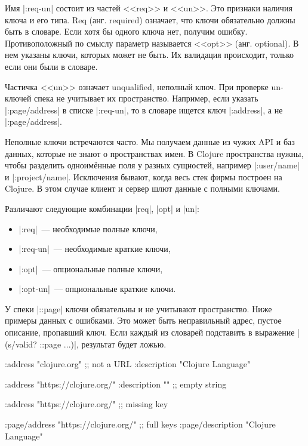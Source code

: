 Имя \spverb|:req-un| состоит из частей <<req>> и <<un>>. Это признаки наличия
ключа и его типа. Req (анг. required) означает, что ключи обязательно должны
быть в словаре. Если хотя бы одного ключа нет, получим ошибку. Противоположный
по смыслу параметр называется <<opt>> (анг. optional). В нем указаны ключи,
которых может не быть. Их валидация происходит, только если они были в словаре.


Частичка <<un>> означает unqualified, неполный ключ. При проверке un-ключей
спека не учитывает их пространство. Например, если указать
\spverb|:page/address| в списке \spverb|:req-un|, то в словаре ищется ключ
\spverb|:address|, а не \spverb|:page/address|.

Неполные ключи встречаются часто. Мы получаем данные из чужих API и баз данных,
которые не знают о пространствах имен. В Clojure пространства нужны, чтобы
разделить одноим\"{е}нные поля у разных сущностей, например \spverb|:user/name| и
\spverb|:project/name|. Исключения бывают, когда весь стек фирмы построен на
Clojure. В этом случае клиент и сервер шлют данные с полными ключами.

Различают следующие комбинации \spverb|req|, \spverb|opt| и \spverb|un|:

\begin{itemize}

\item
  \spverb|:req|~--- необходимые полные ключи,

\item
  \spverb|:req-un|~--- необходимые краткие ключи,


\item
  \spverb|:opt|~--- опциональные полные ключи,


\item
  \spverb|:opt-un|~--- опциональные краткие ключи.

\end{itemize}

У спеки \spverb|::page| ключи обязательны и не учитывают пространство. Ниже
примеры данных с ошибками. Это может быть неправильный адрес, пустое описание,
пропавший ключ. Если каждый из словарей подставить в выражение
\spverb|(s/valid? ::page ...)|, результат будет ложью.

\begin{english}
  \begin{clojure}
{:address "clojure.org" ;; not a URL
 :description "Clojure Language"}

{:address "https://clojure.org/"
 :description ""} ;; empty string

{:address "https://clojure.org/"} ;; missing key

{:page/address "https://clojure.org/" ;; full keys
 :page/description "Clojure Language"}
  \end{clojure}
\end{english}


